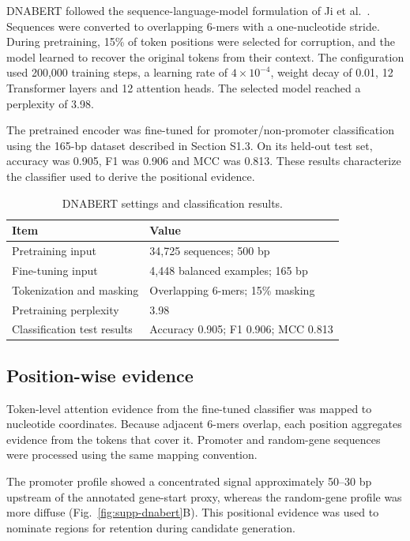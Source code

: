 \documentclass[10pt]{article}
\begin{document}
DNABERT followed the sequence-language-model formulation of Ji et al.\ \cite{Ji2021}. Sequences were converted to overlapping 6-mers with a one-nucleotide stride. During pretraining, 15\% of token positions were selected for corruption, and the model learned to recover the original tokens from their context. The configuration used 200,000 training steps, a learning rate of $4\times10^{-4}$, weight decay of 0.01, 12 Transformer layers and 12 attention heads. The selected model reached a perplexity of 3.98.

The pretrained encoder was fine-tuned for promoter/non-promoter classification using the 165-bp dataset described in Section S1.3. On its held-out test set, accuracy was 0.905, F1 was 0.906 and MCC was 0.813. These results characterize the classifier used to derive the positional evidence.

\begin{table}[htbp]
\centering
\caption{DNABERT settings and classification results.}
\label{tab:dnabert-results}
\begin{tabular}{L{0.40\textwidth}L{0.43\textwidth}}
\toprule
Item & Value \\
\midrule
Pretraining input & 34,725 sequences; 500 bp \\
Fine-tuning input & 4,448 balanced examples; 165 bp \\
Tokenization and masking & Overlapping 6-mers; 15\% masking \\
Pretraining perplexity & 3.98 \\
Classification test results & Accuracy 0.905; F1 0.906; MCC 0.813 \\
\bottomrule
\end{tabular}
\end{table}

\subsection{Position-wise evidence}

Token-level attention evidence from the fine-tuned classifier was mapped to nucleotide coordinates. Because adjacent 6-mers overlap, each position aggregates evidence from the tokens that cover it. Promoter and random-gene sequences were processed using the same mapping convention.

The promoter profile showed a concentrated signal approximately 50--30 bp upstream of the annotated gene-start proxy, whereas the random-gene profile was more diffuse (Fig.~\ref{fig:supp-dnabert}B). This positional evidence was used to nominate regions for retention during candidate generation.
\end{document}
